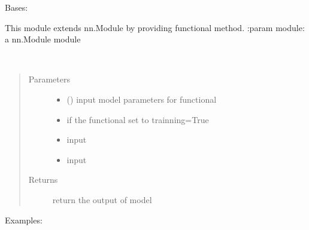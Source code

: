 \documentclass[letterpaper,10pt,english]{sphinxmanual}
\begin{document}
\begin{fulllineitems}
\label{\detokenize{metann:metann.Learner}}
Bases: 

This module extends nn.Module by providing functional method.
:param module: a nn.Module module

\begin{fulllineitems}
\label{\detokenize{metann:metann.Learner.functional}}~\begin{quote}\begin{description}
\item[{Parameters}] \leavevmode\begin{itemize}
\item {} 
 () \textendash{} input model parameters for functional

\item {} 
 \textendash{} if the functional set to trainning=True

\item {} 
 \textendash{} input

\item {} 
 \textendash{} input

\end{itemize}

\item[{Returns}] \leavevmode
return the output of model

\end{description}\end{quote}

Examples:

\begin{sphinxVerbatim}[commandchars=\\\{\}]
\end{sphinxVerbatim}

\end{fulllineitems}


\end{fulllineitems}
\end{document}
